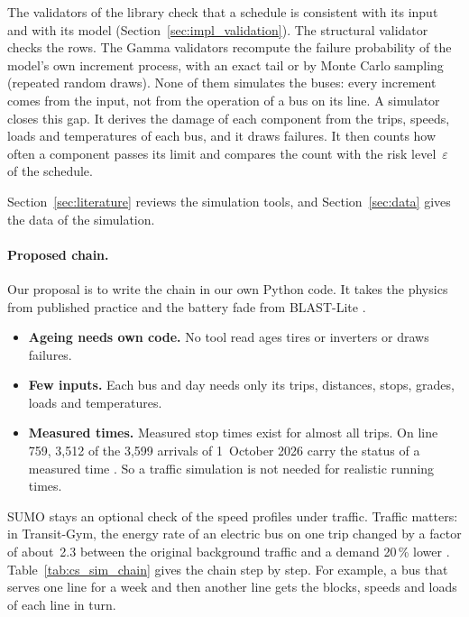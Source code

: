 \documentclass[11pt,a4paper]{article}
\theoremstyle{plain}
\theoremstyle{definition}
\theoremstyle{remark}
\begin{document}
The validators of the library check that a schedule is consistent with its input and with its model (Section~\ref{sec:impl_validation}).
The structural validator checks the rows.
The Gamma validators recompute the failure probability of the model's own increment process, with an exact tail or by Monte Carlo sampling (repeated random draws).
None of them simulates the buses: every increment comes from the input, not from the operation of a bus on its line.
A simulator closes this gap.
It derives the damage of each component from the trips, speeds, loads and temperatures of each bus, and it draws failures.
It then counts how often a component passes its limit and compares the count with the risk level~$\varepsilon$ of the schedule.

Section~\ref{sec:literature} reviews the simulation tools, and Section~\ref{sec:data} gives the data of the simulation.

\paragraph{Proposed chain.}
Our proposal is to write the chain in our own Python code.
It takes the physics from published practice \cite{Heide2025,Konzept2025} and the battery fade from BLAST-Lite \cite{BLASTLite}.
\begin{itemize}
  \item \textbf{Ageing needs own code.} No tool read ages tires or inverters or draws failures.
  \item \textbf{Few inputs.} Each bus and day needs only its trips, distances, stops, grades, loads and temperatures.
  \item \textbf{Measured times.} Measured stop times exist for almost all trips.
    On line 759, 3,512 of the 3,599 arrivals of 1~October 2026 carry the status of a measured time \cite{IstDaten2026}.
    So a traffic simulation is not needed for realistic running times.
\end{itemize}
SUMO stays an optional check of the speed profiles under traffic.
Traffic matters: in Transit-Gym, the energy rate of an electric bus on one trip changed by a factor of about~2.3 between the original background traffic and a demand 20\,\% lower \cite[Table~I]{Sun2021}.
Table~\ref{tab:cs_sim_chain} gives the chain step by step.
For example, a bus that serves one line for a week and then another line gets the blocks, speeds and loads of each line in turn.
\end{document}

